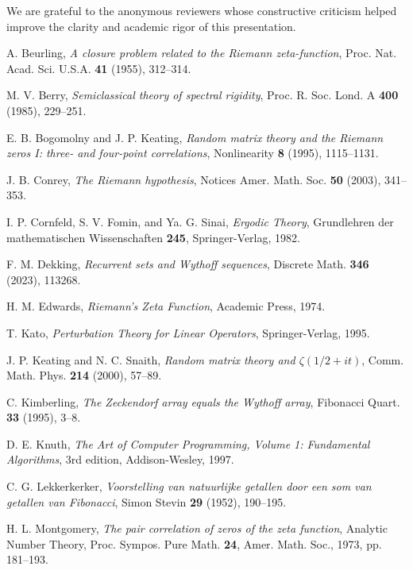 \documentclass[12pt]{article}
\theoremstyle{plain}
\theoremstyle{definition}
\begin{document}
We are grateful to the anonymous reviewers whose constructive criticism helped improve the clarity and academic rigor of this presentation.

\begin{thebibliography}{99}

A. Beurling, \textit{A closure problem related to the Riemann zeta-function}, Proc. Nat. Acad. Sci. U.S.A. \textbf{41} (1955), 312--314.

M. V. Berry, \textit{Semiclassical theory of spectral rigidity}, Proc. R. Soc. Lond. A \textbf{400} (1985), 229--251.

E. B. Bogomolny and J. P. Keating, \textit{Random matrix theory and the Riemann zeros I: three- and four-point correlations}, Nonlinearity \textbf{8} (1995), 1115--1131.

J. B. Conrey, \textit{The Riemann hypothesis}, Notices Amer. Math. Soc. \textbf{50} (2003), 341--353.

I. P. Cornfeld, S. V. Fomin, and Ya. G. Sinai, \textit{Ergodic Theory}, Grundlehren der mathematischen Wissenschaften \textbf{245}, Springer-Verlag, 1982.

F. M. Dekking, \textit{Recurrent sets and Wythoff sequences}, Discrete Math. \textbf{346} (2023), 113268.

H. M. Edwards, \textit{Riemann's Zeta Function}, Academic Press, 1974.

T. Kato, \textit{Perturbation Theory for Linear Operators}, Springer-Verlag, 1995.

J. P. Keating and N. C. Snaith, \textit{Random matrix theory and $\zeta(1/2 + it)$}, Comm. Math. Phys. \textbf{214} (2000), 57--89.

C. Kimberling, \textit{The Zeckendorf array equals the Wythoff array}, Fibonacci Quart. \textbf{33} (1995), 3--8.

D. E. Knuth, \textit{The Art of Computer Programming, Volume 1: Fundamental Algorithms}, 3rd edition, Addison-Wesley, 1997.

C. G. Lekkerkerker, \textit{Voorstelling van natuurlijke getallen door een som van getallen van Fibonacci}, Simon Stevin \textbf{29} (1952), 190--195.

H. L. Montgomery, \textit{The pair correlation of zeros of the zeta function}, Analytic Number Theory, Proc. Sympos. Pure Math. \textbf{24}, Amer. Math. Soc., 1973, pp. 181--193.


\end{thebibliography}
\end{document}
